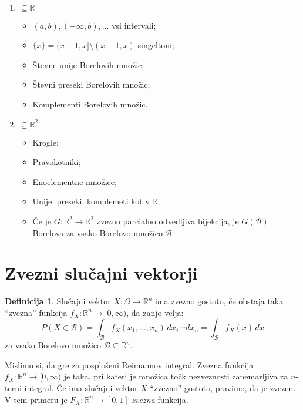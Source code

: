 \documentclass[12pt]{book}
\def\n{\noindent}
\theoremstyle{definition}
\newtheorem{definicija}{Definicija}
\theoremstyle{plain}
\theoremstyle{plain}
\theoremstyle{plain}
\theoremstyle{plain}
\theoremstyle{remark}
\begin{document}
\begin{zgled}
    ~

    \begin{enumerate}
        \item $\subseteq \mathbb{R}$
        \begin{itemize}
            \item $(a, b), (-\infty, b), \ldots$ vsi intervali;
            \item $\{x\}=(x-1,x]\setminus(x-1,x)$ singeltoni;
            \item Števne unije Borelovih množic;
            \item Števni preseki Borelovih množic;
            \item Komplementi Borelovih množic.
        \end{itemize}
        \item $\subseteq \mathbb{R}^2$
        \begin{itemize}
            \item Krogle;
            \item Pravokotniki;
            \item Enoelementne množice;
            \item Unije, preseki, komplemeti kot v $\mathbb{R}$;
            \item Če je $G: \mathbb{R}^2 \rightarrow \mathbb{R}^2$ zvezno parcialno odvedljiva bijekcija, je $G(\mathcal{B})$ Borelova za vsako Borelovo množico $\mathcal{B}$.
        \end{itemize}
    \end{enumerate}
\end{zgled}

\section{Zvezni slučajni vektorji}

\begin{definicija}
    Slučajni vektor $X: \Omega \to \mathbb{R}^n$ ima zvezno gostoto, če obstaja taka “zvezna” funkcija $f_{X}: \mathbb{R}^n \rightarrow[0, \infty)$, da zanjo velja: 
    $$
    P(X \in \mathcal{B})=\int_{\mathcal{B}} f_{X}\left(x_1, \ldots, x_n\right) \, d x_1 \cdots d x_n = \int_{\mathcal{B}}f_X(x) \, dx
    $$
    za vsako Borelovo množico $\mathcal{B} \subseteq \mathbb{R}^n$.
\end{definicija}

\n Mislimo si, da gre za posplošeni Reimannov integral. Zvezna funkcija $f_X: \mathbb{R}^n \to [0,\infty)$  je taka, pri kateri je množica točk nezveznosti zanemarljiva za $n$-terni integral. Če ima slučajni vektor $X$ “zvezno” gostoto, pravimo, da je zvezen. V tem primeru je $F_X: \mathbb{R}^n \to [0,1]$ \emph{zvezna} funkcija.
\end{document}
